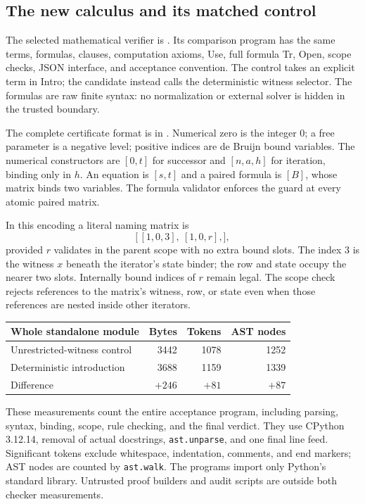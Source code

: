 \documentclass[11pt,letterpaper]{article}
\theoremstyle{definition}\newtheorem{definition}[theorem]{Definition}
\theoremstyle{remark}\newtheorem{remark}[theorem]{Remark}
\begin{document}
\subsection{The new calculus and its matched control}

The selected mathematical verifier is . Its comparison
program  has the same terms, formulas, clauses,
computation axioms, Use, full formula Tr, Open, scope checks, JSON interface,
and acceptance convention. The control takes an explicit term in Intro;
the candidate instead calls the deterministic witness selector. The formulas
are raw finite syntax: no normalization or external solver is hidden in the
trusted boundary.

The complete certificate format is in . Numerical zero
is the integer $0$; a free parameter is a negative level; positive indices
are de Bruijn bound variables. The numerical constructors are $[0,t]$ for
successor and $[n,a,h]$ for iteration, binding only in $h$. An equation is
$[s,t]$ and a paired formula is $[B]$, whose matrix binds two variables.
The formula validator enforces the guard at every atomic paired matrix.

In this encoding a literal naming matrix is
\[
 \bigl[\,[1,0,3],\ [1,0,r],\bigr],
\]
provided $r$ validates in the parent scope with no extra bound slots. The
index $3$ is the witness $x$ beneath the iterator's state binder; the row
and state occupy the nearer two slots. Internally bound indices of $r$
remain legal. The scope check rejects references to the matrix's witness,
row, or state even when those references are nested inside other iterators.

\begin{center}
\begin{tabular}{lrrr}\toprule
Whole standalone module & Bytes & Tokens & AST nodes\\\midrule
Unrestricted-witness control & 3442 & 1078 & 1252\\
Deterministic introduction & 3688 & 1159 & 1339\\
Difference & $+246$ & $+81$ & $+87$\\\bottomrule
\end{tabular}
\end{center}

These measurements count the entire acceptance program, including parsing,
syntax, binding, scope, rule checking, and the final verdict. They use
CPython 3.12.14, removal of actual docstrings, \texttt{ast.unparse}, and one
final line feed. Significant tokens exclude whitespace, indentation,
comments, and end markers; AST nodes are counted by \texttt{ast.walk}.
The programs import only Python's standard library. Untrusted proof builders
and audit scripts are outside both checker measurements.
\end{document}
